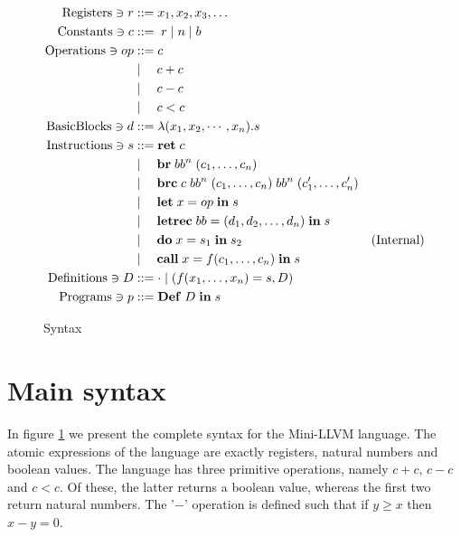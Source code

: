 \documentclass[a4paper, oneside, 10pt, draft]{memoir}
\begin{document}
\newcommand{\ibr}[2]{\mathbf{br} \; #1 \; #2}
\newcommand{\ibrc}[5]{\mathbf{brc} \; #1 \; #2 \; #3 \; #4 \; #5}
\newcommand{\ilet}[3]{\mathbf{let} \; #1 = #2 \; \mathbf{in} \; #3}
\newcommand{\iletrec}[3]{\mathbf{letrec} \; #1 = #2 \; \mathbf{in} \; #3}
\newcommand{\ido}[3]{\mathbf{do} \; #1 = #2 \; \mathbf{in} \; #3}
\newcommand{\icall}[4]{\mathbf{call} \; #1 = #2 #3\; \mathbf{in} \;
  #4}
\newcommand{\ipgm}[2]{\mathbf{Def} \; #1 \; \mathbf{in} \; #2}
\begin{figure}
  \begin{align*}
    \registers \ni r & ::= x_1, x_2, x_3, \dotsc\\
    \constants \ni c & ::= \; r \bor \nat \bor \bool \\
    \operations \ni op & ::= c \\
                       & \bor \quad c + c \\
                       & \bor \quad c - c \\
                       & \bor \quad c < c \\
   \basicblocks \ni d  & ::= \lambda (x_1, x_2, \cdots, x_n) . s\\
   \instructions \ni s & ::= \iret{c} \\
                       & \bor \quad \ibr{bb^n}{(c_1, \dotsc, c_n)} \\
                       & \bor \quad \ibrc{c}{bb^n}{(c_1, \dotsc, c_n)}{bb^n}{(c'_1, \dotsc, c'_n)}\\
                       & \bor \quad \ilet{x}{op}{s} \\
                       & \bor \quad \iletrec{bb}{(d_1, d_2, \dotsc, d_n)}{s} \\
                       & \bor \quad \ido{x}{s_1}{s_2} &
                       (\text{Internal})\\
                       & \bor \quad \icall{x}{f}{(c_1, \dotsc,
                         c_n)}{s}\\
    \definitions \ni D & ::= \cdot \bor (f(x_1, \dotsc, x_n) = s, D)\\
    \programs \ni p & ::= \ipgm{D}{s}
  \end{align*}
  \caption{Syntax}
  \label{fig:syntax}
\end{figure}

\section{Main syntax}

In figure \ref{fig:syntax} we present the complete syntax for the
Mini-LLVM language. The atomic expressions of the language are exactly
registers, natural numbers and boolean values. The language has three
primitive operations, namely $c + c$, $c - c$ and $c < c$. Of these,
the latter returns a boolean value, whereas the first two return
natural numbers. The '$-$' operation is defined such that if $y \geq
x$ then $x - y = 0$.
\end{document}
